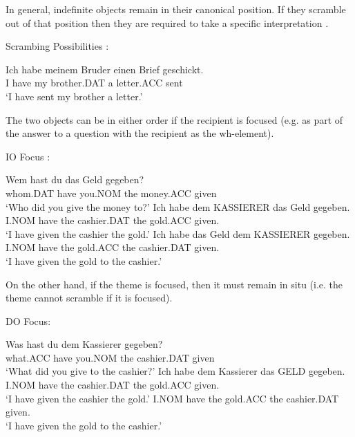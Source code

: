 In general, indefinite objects remain in their canonical position. If they scramble out of that position then they are required to take a specific interpretation \citep{Diesing.1992}.
\begin{exe}
\ex Scrambing Possibilities \citep{Choi.1996}: 
\begin{xlist}
\ex \gll Ich habe meinem Bruder einen Brief geschickt.\\
I have my brother.DAT a letter.ACC sent\\
\trans `I have sent my brother a letter.'
\end{xlist}
\end{exe}
The two objects can be in either order if the recipient is focused (e.g. as part of the answer to a question with the recipient as the wh-element).
\begin{exe}
\ex IO Focus \citep{Choi.1996}:
\begin{xlist}
\ex \gll Wem hast du das Geld gegeben?\\
whom.DAT have you.NOM the money.ACC given\\
\trans `Who did you give the money to?'
\ex \gll Ich habe dem KASSIERER das Geld gegeben.\\
I.NOM have the cashier.DAT the gold.ACC given.\\
\trans `I have given the cashier the gold.'
\ex \gll Ich habe das Geld dem KASSIERER gegeben.\\
I.NOM have the gold.ACC the cashier.DAT given.\\
\trans `I have given the gold to the cashier.'
\end{xlist}
\end{exe}
On the other hand, if the theme is focused, then it must remain in situ (i.e. the theme cannot scramble if it is focused). 
\begin{exe}
\ex DO Focus:
\begin{xlist}
\ex \gll Was hast du dem Kassierer gegeben?\\
what.ACC have you.NOM the cashier.DAT given\\
\trans `What did you give to the cashier?'
\ex \gll Ich habe dem Kassierer das GELD gegeben.\\
I.NOM have the cashier.DAT the gold.ACC given.\\
\trans `I have given the cashier the gold.'
I.NOM have the gold.ACC the cashier.DAT given.\\
\trans `I have given the gold to the cashier.'
\end{xlist}
\end{exe}
